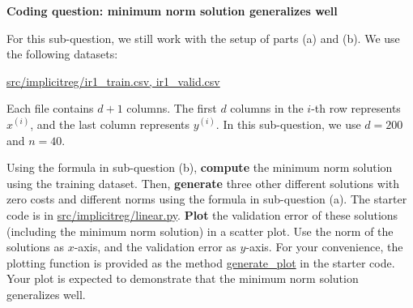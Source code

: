\item{} 
\textbf{Coding question: minimum norm solution generalizes well}

For this sub-question, we still work with the setup of parts (a) and (b). We use the following datasets:
\begin{center}
	\url{src/implicitreg/ir1_train.csv, ir1_valid.csv}
\end{center}
Each file contains $d+1$ columns. The first $d$ columns in the $i$-th row represents $x^{(i)}$, and the last column represents $y^{(i)}.$ In this sub-question, we use $d=200$ and $n=40$.

Using the formula in sub-question (b), \textbf{compute} the minimum norm solution using the training dataset. Then, \textbf{generate} three other different solutions with zero costs and different norms using the formula in sub-question (a).
The starter code is in \url{src/implicitreg/linear.py}. \textbf{Plot} the validation error of these solutions (including the minimum norm solution) in a scatter plot. 
Use the norm of the solutions as $x$-axis, and the validation error as $y$-axis. For your convenience, the plotting function is provided as the method \url{generate_plot} in the starter code. 
Your plot is expected to demonstrate that the minimum norm solution generalizes well.